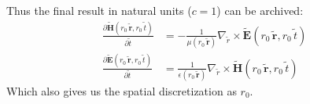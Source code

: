 \documentclass[12pt,a4paper]{article}
\begin{document}
	Thus the final result in natural units (\(c=1\)) can be archived:
	\begin{align}
		\frac{\partial \widetilde{\mathbf{H}}(r_0\,\widetilde{\mathbf{r}},r_0\,\widetilde{t})}{\partial \widetilde{t}}&=-\frac{1}{\mu(r_0\,\widetilde{\mathbf{r}})}\nabla_{\widetilde{r}}\times\widetilde{\mathbf{E}}(r_0\,\widetilde{\mathbf{r}},r_0\,\widetilde{t})\\
		\frac{\partial \widetilde{\mathbf{E}}(r_0\,\widetilde{\mathbf{r}},r_0\,\widetilde{t})}{\partial \widetilde{t}}&=\frac{1}{\epsilon(r_0\,\widetilde{\mathbf{r}})}\nabla_{\widetilde{r}}\times\widetilde{\mathbf{H}}(r_0\,\widetilde{\mathbf{r}},r_0\,\widetilde{t})
	\end{align}
	Which also gives us the spatial discretization as \(r_0\).
\end{document}
